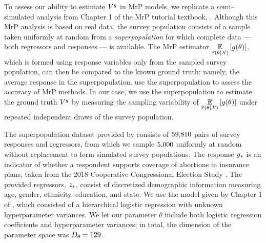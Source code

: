 To assess our ability to estimate $V^g$ in MrP models, we replicate a
semi--simulated analysis from Chapter 1 of the MrP tutorial textbook,
\citet{lopezmartin:2022:mrptutorial}.  Although this MrP analysis is based on
real data, the survey population consists of a sample taken uniformly at random
from a \emph{superpopulation} for which complete data --- both regressors and
responses --- is available.  The MrP estimator $\underset{\mathbb{P}(\theta | {\mathcal{X}})}{\mathbb{E}}\left[g(\theta)\right]$,
which is formed using response variables only from the sampled survey population,
can then be compared to the known ground truth: namely, the average response in
the superpopulation. \citet{lopezmartin:2022:mrptutorial} use the
superpopulation to assess the accuracy of MrP methods.  In our case, we use
the superpopulation to estimate the ground truth $V^g$ by measuring the
sampling variability of $\underset{\mathbb{P}(\theta | {\mathcal{X}})}{\mathbb{E}}\left[g(\theta)\right]$ under repeated independent
draws of the survey population.

The superpopulation dataset provided by \citet{lopezmartin:2022:mrptutorial}
consists of $59{,}810$ pairs of survey responses and regressors, from which
we sample $5{,}000$ uniformly at random without replacement to form simulated
survey populations.  The response $y_{*}$ is an indicator of whether a respondent
supports coverage of abortions in insurance plans, taken from the 2018
Cooperative Congressional Election Study \citep{schaffner:2018:cces}.  The
provided regressors, $z_{*}$, consist of discretized demographic information
measuring age, gender, ethnicity, education, and state.  We use the model given
by Chapter 1 of \citet{lopezmartin:2022:mrptutorial}, which consisted of a
hierarchical logistic regression with unknown hyperparameter variances.  We let
our parameter $\theta$ include both logistic regression coefficients and
hyperparameter variances; in total, the dimension of the parameter space was
$D_\theta = 129$.

